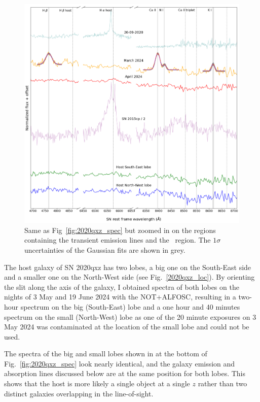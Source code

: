 \documentclass[a4paper,oneside,12pt, class=Latex/Classes/PhDthesisPSnPDF, crop=false]{standalone}
\begin{document}
\begin{figure}
    \centering
    \includegraphics[width=\textwidth]{../Images/chapter_5/2020qxz_spec_zoom.png}
    \caption{Same as Fig~\ref{fig:2020qxz_spec} but zoomed in on the regions containing the transient emission lines and the \Halpha\ region. The $1\sigma$ uncertainties of the Gaussian fits are shown in grey.}
    \label{2020qxz_spec_zoom}
\end{figure}

The host galaxy of SN 2020qxz has two lobes, a big one on the South-East side and a smaller one on the North-West side (see Fig.~\ref{2020qxz_loc}). By orienting the slit along the axis of the galaxy, I obtained spectra of both lobes on the nights of 3 May and 19 June 2024 with the NOT+ALFOSC, resulting in a two-hour spectrum on the big (South-East) lobe and a one hour and 40 minutes spectrum on the small (North-West) lobe as one of the 20 minute exposures on 3 May 2024 was contaminated at the location of the small lobe and could not be used. 

The spectra of the big and small lobes shown in at the bottom of Fig.~\ref{fig:2020qxz_spec} look nearly identical, and the galaxy emission and absorption lines discussed below are at the same position for both lobes. This shows that the host is more likely a single object at a single $z$ rather than two distinct galaxies overlapping in the line-of-sight.
\end{document}
